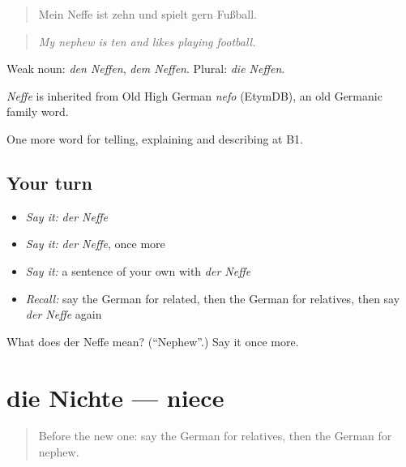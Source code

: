\begin{quote}
Mein Neffe ist zehn und spielt gern Fußball.
\end{quote}

\begin{quote}
\emph{My nephew is ten and likes playing football.}
\end{quote}

Weak noun: \emph{den Neffen}, \emph{dem Neffen}. Plural: \emph{die Neffen}.

\begin{cousinweb}
\emph{Neffe} is inherited from Old High German \emph{nefo} (EtymDB), an old Germanic family word.
\end{cousinweb}

\begin{grammarlens}[title={What you've built}]
One more word for telling, explaining and describing at B1.
\end{grammarlens}

\subsection*{Your turn}
\begin{itemize}
\raggedright
  \item \emph{Say it:} \emph{der Neffe}
  \item \emph{Say it:} \emph{der Neffe}, once more
  \item \emph{Say it:} a sentence of your own with \emph{der Neffe}
  \item \emph{Recall:} say the German for related, then the German for relatives, then say \emph{der Neffe} again
\end{itemize}

\begin{tcolorbox}[breakable,colback=teal!4,colframe=teal!35!black,title={Before you move on}]
What does der Neffe mean? (\textquotedblleft{}Nephew\textquotedblright{}.) Say it once more.
\end{tcolorbox}
\section[die Nichte]{die Nichte — niece}

\label{lesson:GE-C489-nichte}



\begin{quote}
Before the new one: say the German for relatives, then the German for nephew.
\end{quote}

